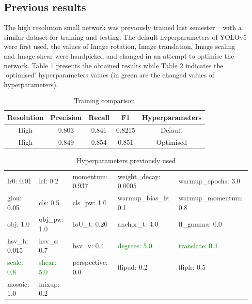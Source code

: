 \documentclass{article}
\begin{document}
\subsection{Previous results}


The high resolution small network was previously trained last semester ~\cite{stefano} with a similar dataset for training and testing. The default hyperparameters of YOLOv5 were first used, the values of Image rotation, Image translation, Image scaling and Image shear were handpicked and changed in an attempt to optimise the network. \hyperref[Table 1]{Table 1} presents the obtained results while \hyperref[Table 2]{Table 2} indicates the 'optimised' hyperparameters values (in green are the changed values of hyperparameters).


\begin{table}[h!]
\centering
\begin{tabular}{|c|c|c|c|c|} 
 \hline
 Resolution &  Precision & Recall & F1 & Hyperparameters \\ [0.5ex] 
 \hline\hline
 High & 0.803 & 0.841 & 0.8215 & Default \\ 
 High & 0.849 & 0.854 & 0.851 & Optimised \\
 
 \hline
\end{tabular}
\caption{Training comparison}
\label{Table 1}
\end{table}

\begin{table}[h!]
\begin{center}
    \begin{tabular}{| l | l | l | l | l |}
    \hline
    lr0: 0.01 & lrf: 0.2 & momentum: 0.937 & weight\_decay: 0.0005 & warmup\_epochs: 3.0 \\
    giou: 0.05 & cls: 0.5 & cls\_pw: 1.0 & warmup\_bias\_lr: 0.1  & warmup\_momentum: 0.8 \\
    obj: 1.0 & obj\_pw: 1.0 & IoU\_t: 0.20 & anchor\_t: 4.0 & fl\_gamma: 0.0 \\
    hsv\_h: 0.015 & hsv\_s: 0.7 & hsv\_v: 0.4 & \textcolor{green}{degrees: 5.0} & \textcolor{green}{translate: 0.3} \\
    \textcolor{green}{scale: 0.8} & \textcolor{green}{shear: 5.0} & perspective: 0.0 & flipud: 0.2 & fliplr: 0.5 \\
    mosaic: 1.0 & mixup: 0.2 & & & \\
    \hline
    \end{tabular}
    \caption{Hyperparameters previously used}    
    \label{Table 2}
\end{center}
\end{table}
\end{document}
